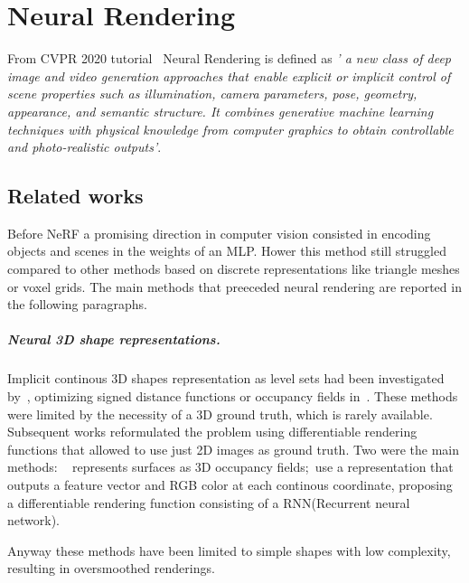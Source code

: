 \chapter{Neural Rendering}\label{sec:Neural}
From CVPR 2020 tutorial~\cite{CVPRtutorial} Neural Rendering is defined as \textit{'
 a new class of deep image and video generation approaches that 
 enable explicit or implicit control of scene properties such as 
 illumination, camera parameters, pose, geometry, appearance, and 
 semantic structure. It combines generative machine learning techniques 
 with physical knowledge from computer graphics to obtain controllable 
 and photo-realistic outputs'}.

\section{Related works}
Before NeRF a promising direction in computer vision
 consisted in encoding objects and scenes in the weights of an MLP. Hower this
 method still struggled compared to other methods based on discrete representations
 like triangle meshes or voxel grids. The main methods 
 that preeceded neural rendering are reported in the following paragraphs.
 
 \paragraph{Neural 3D shape representations.} Implicit continous 3D shapes 
 representation as level sets had been investigated by~\cite{nerf15,nerf32}, optimizing
 signed distance functions or occupancy fields in~\cite{nerf11,nerf27}.
 These methods were limited by the necessity of a 3D ground truth, which is 
 rarely available. Subsequent works reformulated the problem using differentiable
 rendering functions that allowed to use just 2D images as ground truth. Two were the main methods:
 ~\cite{nerf29} represents surfaces as 3D occupancy fields;~\cite{nerf42}use a 
 representation that outputs a feature vector and RGB color at each continous 
 coordinate, proposing a differentiable rendering function consisting of a 
 RNN(Recurrent neural network).
 
 Anyway these methods have been limited to simple shapes with low complexity,
 resulting in oversmoothed renderings.
 
